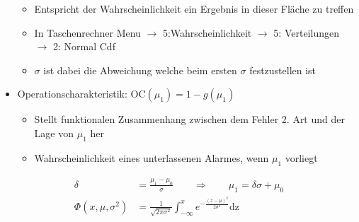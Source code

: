 \begin{itemize}
	\begin{itemize}
		\item Entspricht der Wahrscheinlichkeit ein Ergebnis in dieser Fläche zu treffen
		\item In Taschenrechner \glqq Menu $\rightarrow$ 5:Wahrscheinlichkeit $\rightarrow$ 5: Verteilungen $\rightarrow$ 2: Normal Cdf
		\item [] $\sigma$ ist dabei die Abweichung welche beim ersten $\sigma$ festzustellen ist
	\end{itemize}
	\item Operationscharakteristik: $\text{OC}(\mu_1)  = 1-g(\mu_1)$
	\begin{itemize}
		\item Stellt funktionalen Zusammenhang zwischen dem Fehler 2. Art und der Lage von $\mu_1$ her
		\item Wahrscheinlichkeit eines unterlassenen Alarmes, wenn $\mu_1$ vorliegt
	\end{itemize}
\end{itemize}
\begin{align}
	\label{eq:delta}
	\delta&=\frac{\mu_1-\mu_0}{\sigma}\qquad \Rightarrow \qquad \mu_1 = \delta\sigma+\mu_0\\
	\label{eq:Phi}
	\Phi(x,\mu,\sigma^2)&=\frac{1}{\sqrt{2\pi\sigma^2}}\int_{-\infty}^{x}e^{-\frac{\left( z-\mu\right)^2}{2\sigma^2}}\text{dz}
\end{align}

